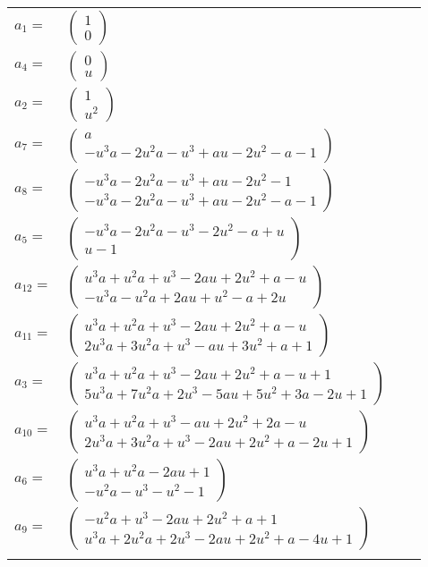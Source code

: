 \documentclass[1p]{elsarticle_modified}
\theoremstyle{definition}
\begin{document}
\begin{tabular}{m{7pt} m{180pt} m{7pt} m{180pt} }
\flushright $a_{1}=$&$\begin{pmatrix}1\\0\end{pmatrix}$ \\
\flushright $a_{4}=$&$\begin{pmatrix}0\\u\end{pmatrix}$ \\
\flushright $a_{2}=$&$\begin{pmatrix}1\\u^2\end{pmatrix}$ \\
\flushright $a_{7}=$&$\begin{pmatrix}a\\- u^3 a-2 u^2 a- u^3+a u-2 u^2- a-1\end{pmatrix}$ \\
\flushright $a_{8}=$&$\begin{pmatrix}- u^3 a-2 u^2 a- u^3+a u-2 u^2-1\\- u^3 a-2 u^2 a- u^3+a u-2 u^2- a-1\end{pmatrix}$ \\
\flushright $a_{5}=$&$\begin{pmatrix}- u^3 a-2 u^2 a- u^3-2 u^2- a+u\\u-1\end{pmatrix}$ \\
\flushright $a_{12}=$&$\begin{pmatrix}u^3 a+u^2 a+u^3-2 a u+2 u^2+a- u\\- u^3 a- u^2 a+2 a u+u^2- a+2 u\end{pmatrix}$ \\
\flushright $a_{11}=$&$\begin{pmatrix}u^3 a+u^2 a+u^3-2 a u+2 u^2+a- u\\2 u^3 a+3 u^2 a+u^3- a u+3 u^2+a+1\end{pmatrix}$ \\
\flushright $a_{3}=$&$\begin{pmatrix}u^3 a+u^2 a+u^3-2 a u+2 u^2+a- u+1\\5 u^3 a+7 u^2 a+2 u^3-5 a u+5 u^2+3 a-2 u+1\end{pmatrix}$ \\
\flushright $a_{10}=$&$\begin{pmatrix}u^3 a+u^2 a+u^3- a u+2 u^2+2 a- u\\2 u^3 a+3 u^2 a+u^3-2 a u+2 u^2+a-2 u+1\end{pmatrix}$ \\
\flushright $a_{6}=$&$\begin{pmatrix}u^3 a+u^2 a-2 a u+1\\- u^2 a- u^3- u^2-1\end{pmatrix}$ \\
\flushright $a_{9}=$&$\begin{pmatrix}- u^2 a+u^3-2 a u+2 u^2+a+1\\u^3 a+2 u^2 a+2 u^3-2 a u+2 u^2+a-4 u+1\end{pmatrix}$\\&\end{tabular}
\end{document}
